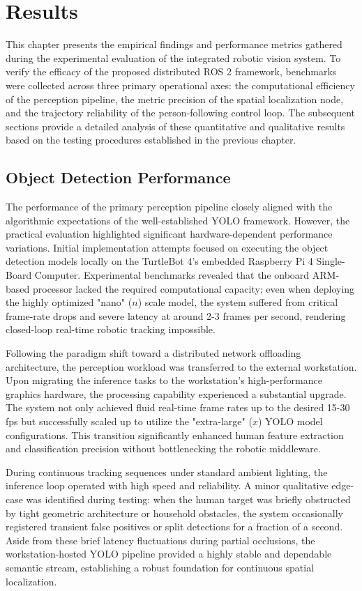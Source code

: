 \chapter{Results}
This chapter presents the empirical findings and performance metrics gathered during the experimental evaluation of the integrated robotic vision system. To verify the efficacy of the proposed distributed ROS 2 framework, benchmarks were collected across three primary operational axes: the computational efficiency of the perception pipeline, the metric precision of the spatial localization node, and the trajectory reliability of the person-following control loop. The subsequent sections provide a detailed analysis of these quantitative and qualitative results based on the testing procedures established in the previous chapter.

\section{Object Detection Performance}
The performance of the primary perception pipeline closely aligned with the algorithmic expectations of the well-established YOLO framework. However, the practical evaluation highlighted significant hardware-dependent performance variations. Initial implementation attempts focused on executing the object detection models locally on the TurtleBot 4's embedded Raspberry Pi 4 Single-Board Computer. Experimental benchmarks revealed that the onboard ARM-based processor lacked the required computational capacity; even when deploying the highly optimized "nano" ($n$) scale model, the system suffered from critical frame-rate drops and severe latency at around 2-3 frames per second, rendering closed-loop real-time robotic tracking impossible.

Following the paradigm shift toward a distributed network offloading architecture, the perception workload was transferred to the external workstation. Upon migrating the inference tasks to the workstation's high-performance graphics hardware, the processing capability experienced a substantial upgrade. The system not only achieved fluid real-time frame rates up to the desired 15-30 fps but successfully scaled up to utilize the "extra-large" ($x$) YOLO model configurations. This transition significantly enhanced human feature extraction and classification precision without bottlenecking the robotic middleware.

During continuous tracking sequences under standard ambient lighting, the inference loop operated with high speed and reliability. A minor qualitative edge-case was identified during testing: when the human target was briefly obstructed by tight geometric architecture or household obstacles, the system occasionally registered transient false positives or split detections for a fraction of a second. Aside from these brief latency fluctuations during partial occlusions, the workstation-hosted YOLO pipeline provided a highly stable and dependable semantic stream, establishing a robust foundation for continuous spatial localization.

